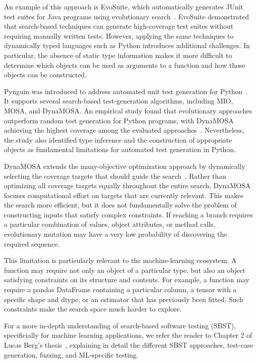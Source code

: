 \documentclass{article}
\begin{document}
An example of this approach is EvoSuite, which automatically generates JUnit test suites for Java programs using evolutionary search~\cite{ESECFSE11}. EvoSuite demonstrated that search-based techniques can generate high-coverage test suites without requiring manually written tests. However, applying the same techniques to dynamically typed languages such as Python introduces additional challenges. In particular, the absence of static type information makes it more difficult to determine which objects can be used as arguments to a function and how those objects can be constructed.

Pynguin was introduced to address automated unit test generation for Python~\cite{Lukasczyk_Pynguin_Automated_Unit_2022}. It supports several search-based test-generation algorithms, including MIO, MOSA, and DynaMOSA. An empirical study found that evolutionary approaches outperform random test generation for Python programs, with DynaMOSA achieving the highest coverage among the evaluated approaches~\cite{Lukasczyk_Pynguin_Automated_Unit_2022}. Nevertheless, the study also identified type inference and the construction of appropriate objects as fundamental limitations for automated test generation in Python.

DynaMOSA extends the many-objective optimization approach by dynamically selecting the coverage targets that should guide the search~\cite{7840029}. Rather than optimizing all coverage targets equally throughout the entire search, DynaMOSA focuses computational effort on targets that are currently relevant. This makes the search more efficient, but it does not fundamentally solve the problem of constructing inputs that satisfy complex constraints. If reaching a branch requires a particular combination of values, object attributes, or method calls, evolutionary mutation may have a very low probability of discovering the required sequence.

This limitation is particularly relevant to the machine-learning ecosystem. A function may require not only an object of a particular type, but also an object satisfying constraints on its structure and contents. For example, a function may require a pandas DataFrame containing a particular column, a tensor with a specific shape and dtype, or an estimator that has previously been fitted. Such constraints make the search space much harder to explore.

For a more in-depth understanding of search-based software testing (SBST), specificially for machine learning applications, we refer the reader to Chapter 2 of Lucas Berg's thesis~\cite{Lucas_Berg_Improving_automated_unit_test_generation_for_machine_learning_libraries_using_structured_input_data_2024}, explaining in detail the different SBST approaches, test-case generation, fuzzing, and ML-specific testing.
\end{document}
